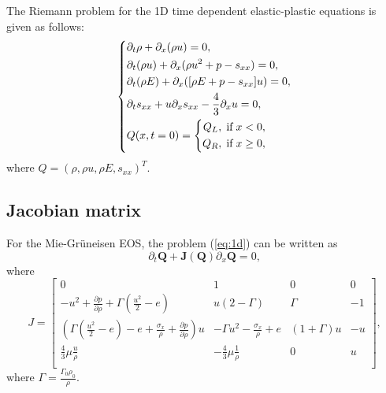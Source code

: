 \documentclass{article}
\numberwithin{equation}{section}
\numberwithin{table}{section}
\begin{document}
The Riemann problem for the 1D time dependent elastic-plastic equations is given as follows:
 \begin{equation}\label{eq:1d}
   \left\{ \begin{aligned}
	   & \partial _t \rho +\partial_x(\rho u)=0,\\
	   & \partial _t (\rho u)+\partial_x(\rho u^2 + p -s_{xx})=0,\\
	   &\partial _t (\rho E)+\partial_x([\rho E + p -s_{xx}]u)=0,\\
	   &\partial _t s_{xx}+u\partial_xs_{xx}-\frac{4}{3}\partial_x u=0,\\
	   &Q(x,t = 0) = \left\{\begin{aligned}
		   Q_L, \hspace{0.1cm} \text{if} \hspace{0.1cm} x<0, \\
		   Q_R, \hspace{0.1cm} \text{if} \hspace{0.1cm} x\ge 0, \\
	   \end{aligned}\right.
	 \end{aligned}
  \right.
\end{equation}
where $Q = (\rho, \rho u, \rho E, s_{xx})^T$.

\subsection{Jacobian matrix} %
For the Mie-Gr\"uneisen EOS, the problem (\ref{eq:1d}) can be written as
\begin{equation}
  \partial _t \bm{Q} +\bm{J}(\bm{Q})\partial_x\bm{Q} = 0,
\end{equation}
where
\begin{equation}\label{eq:Jcb}
  J = \left[\begin{array}{llll}
	  0 & 1 & 0 & 0 \\
	  -u^2 + \frac{\partial p}{\partial \rho} +\Gamma(\frac{u^2}{2}-e)& u(2-\Gamma)& \Gamma & -1 \\
	  (\Gamma(\frac{u^2}{2}-e)-e+\frac{\sigma_x}{\rho}+\frac{\partial p}{\partial \rho})u & -\Gamma u^2 -\frac{\sigma_x}{\rho} +e & (1+\Gamma)u& -u\\
	\frac{4}{3}\mu\frac{u}{\rho} & -\frac{4}{3}\mu\frac{1}{\rho}& 0 & u \\ 
\end{array}
\right],
\end{equation}
where $\Gamma = \frac{\Gamma_0\rho_0}{\rho} $.
\end{document}
